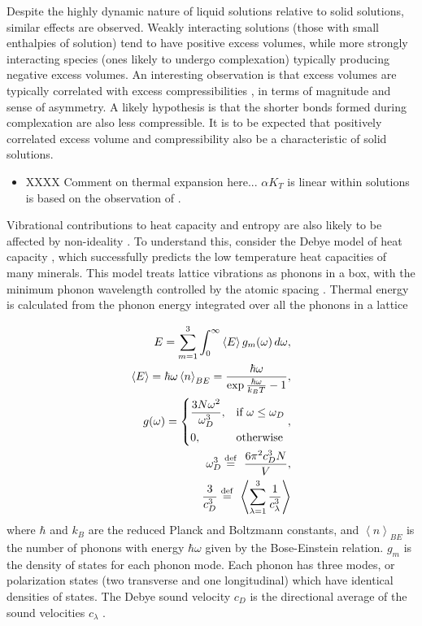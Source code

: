 Despite the highly dynamic nature of liquid solutions relative to solid solutions, similar effects are observed. Weakly interacting solutions (those with small enthalpies of solution) tend to have positive excess volumes, while more strongly interacting species (ones likely to undergo complexation) typically producing negative excess volumes. An interesting observation is that excess volumes are typically correlated with excess compressibilities \citep{FM1965}, in terms of magnitude and sense of asymmetry. A likely hypothesis is that the shorter bonds formed during complexation are also less compressible. It is to be expected that positively correlated excess volume and compressibility also be a characteristic of solid solutions. 

\begin{itemize}
\item XXXX Comment on thermal expansion here... $\alpha K_T$ is linear within solutions is based on the observation of \cite{WVCCJB2005}.
\end{itemize}

Vibrational contributions to heat capacity and entropy are also likely to be affected by non-ideality \citep[e.g.][]{WC2002}. To understand this, consider the Debye model of heat capacity \citep{Debye1912}, which successfully predicts the low temperature heat capacities of many minerals. This model treats lattice vibrations as phonons in a box, with the minimum phonon wavelength controlled by the atomic spacing \citep{AM1976, Grimvall1999}. Thermal energy is calculated from the phonon energy integrated over all the phonons in a lattice


\begin{eqnarray}
E = \sum_{m=1}^3 \int_0^{\infty} \left<E \right> g_m(\omega)\, d\omega, \\
\left<E \right> = \hbar \omega \left<n \right>_{BE} = \frac{\hbar \omega}{\exp{\frac{\hbar \omega}{k_B T}} - 1}, \\
g(\omega) = \left\{ \begin{aligned}
    &\frac{3 N \omega^2}{\omega_D^3}, && \text{if}\ \omega \leq \omega_D\\
    &0, && \text{otherwise}
  \end{aligned}  \right. ,\\
\omega_D^3 \stackrel{\mathrm{def}}{=}\ {6 \pi^2 c_D^3 N \over V},\\
{3 \over c_D^3 } \stackrel{\mathrm{def}}{=}\ \left< \sum_{\lambda=1}^{3} {1 \over c_{\lambda}^3 }\right>
\end{eqnarray} 
\noindent where $\hbar$ and $k_B$ are the reduced Planck and Boltzmann constants, and $\left<n \right>_{BE}$ is the number of phonons with energy $\hbar \omega$ given by the Bose-Einstein relation. $g_m$ is the density of states for each phonon mode. Each phonon has three modes, or polarization states (two transverse and one longitudinal) which have identical densities of states. The Debye sound velocity $c_D$ is the directional average of the sound velocities $c_{\lambda}$ \citep{Grimvall1999}.

